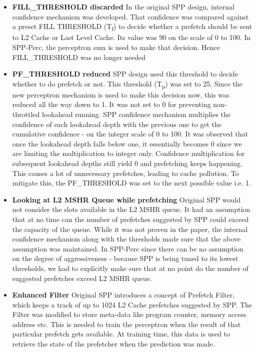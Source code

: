 \documentclass{sig-alternate}
\begin{document}
\begin{itemize}
\item \textbf{FILL\_THRESHOLD  discarded}\newline
In the original SPP design, internal confidence mechanism was developed. 
That confidence was compared against a preset FILL \textunderscore THRESHOLD (T\textsubscript{f}) to decide whether a prefetch should be sent to L2 Cache or Last Level Cache. 
Its value was 90 on the scale of 0 to 100. 
In SPP-Perc, the perceptron sum is used to make that decision. 
Hence FILL\_THRESHOLD was no longer needed

\item \textbf{PF\_THRESHOLD reduced}\newline
SPP design used this threshold to decide whether to do prefetch or not. 
This threshold (T\textsubscript{p}) was set to 25. 
Since the new perceptron mechanism is used to make this decision now, this was reduced all the way down to 1. 
It was not set to 0 for preventing non-throttled lookahead running. 
SPP confidence mechanism multiplies the confidence of each lookahead depth with the previous one to get the cumulative confidence - on the integer scale of 0 to 100. 
It was observed that once the lookahead depth falls below one, it essentially becomes 0 since we are limiting the multiplication to integer only. 
Confidence multiplication for subsequent lookahead depths still yield 0 and prefetching keeps happening. 
This causes a lot of unnecessary prefetches, leading to cache pollution. 
To mitigate this, the PF\_THRESHOLD was set to the next possible value i.e. 1. 


\item \textbf{Looking at L2 MSHR Queue while prefetching}\newline
Original SPP would not consider the slots available in the L2 MSHR queue. 
It had an assumption that at no time can the number of prefetches suggested by SPP could exceed the capacity of the queue. 
While it was not proven in the paper, the internal confidence mechanism along with the thresholds made sure that the above assumption was maintained. 
In SPP-Perc since there can be no assumption on the degree of aggressiveness - because SPP is being tuned to its lowest thresholds, we had to explicitly make sure that at no point do the number of suggested prefetches exceed L2 MSHR queue.

\item \textbf{Enhanced Filter}\newline
Original SPP introduces a concept of Prefetch Filter, which keeps a track of up to 1024 L2 Cache prefetches suggested by SPP. 
The Filter was modified to store meta-data like program counter, memory access address etc. 
This is needed to train the perceptron when the result of that particular prefetch gets available. 
At training time, this data is used to retrieve the state of the prefetcher when the prediction was made.


\end{itemize}
\end{document}
